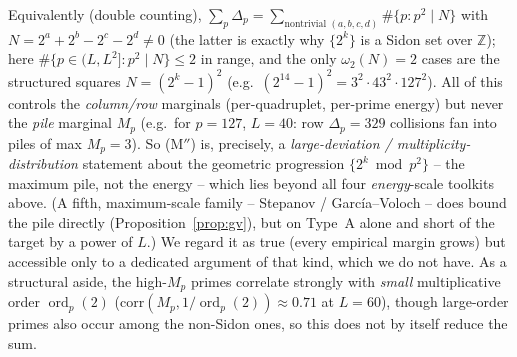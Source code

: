 \documentclass[11pt]{article}
\theoremstyle{plain}
\theoremstyle{definition}
\theoremstyle{remark}
\newcommand{\Z}{\mathbb{Z}}
\newcommand{\ord}{\operatorname{ord}}
\begin{document}
Equivalently (double counting), $\sum_p\Delta_p=\sum_{\text{nontrivial }(a,b,c,d)}
\#\{p:p^2\mid N\}$ with $N=2^a+2^b-2^c-2^d\ne0$ (the latter is exactly why
$\{2^k\}$ is a Sidon set over $\Z$); here $\#\{p\in(L,L^2]:p^2\mid N\}\le2$ in
range, and the only $\omega_2(N)=2$ cases are the structured squares
$N=(2^k-1)^2$ (e.g.\ $(2^{14}-1)^2=3^2\!\cdot\!43^2\!\cdot\!127^2$). All of this
controls the \emph{column/row} marginals (per-quadruplet, per-prime energy) but
never the \emph{pile} marginal $M_p$ (e.g.\ for $p=127$, $L=40$: row $\Delta_p=329$
collisions fan into piles of max $M_p=3$). So (M$''$) is, precisely, a
\emph{large-deviation / multiplicity-distribution} statement about the geometric
progression $\{2^k\bmod p^2\}$ -- the maximum pile, not the energy -- which lies
beyond all four \emph{energy}-scale toolkits above. (A fifth, maximum-scale
family -- Stepanov / García--Voloch -- does bound the pile directly
(Proposition~\ref{prop:gv}), but on Type~A alone and short of the
target by a power of $L$.) We regard it as true (every empirical margin
grows) but accessible only to a dedicated argument of that kind, which we do not
have. As a structural aside, the high-$M_p$ primes correlate strongly with
\emph{small} multiplicative order $\ord_p(2)$ ($\mathrm{corr}(M_p,1/\ord_p(2))
\approx0.71$ at $L=60$), though large-order primes also occur among the
non-Sidon ones, so this does not by itself reduce the sum.
\end{document}
